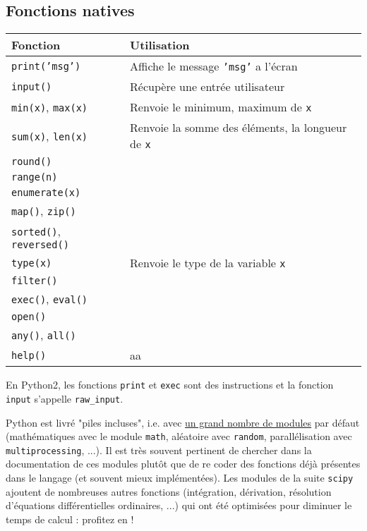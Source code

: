 \documentclass{article}
\begin{document}
\subsection*{Fonctions natives}

\begin{tabular}{|l|l|}
    \hline
    Fonction                                    & Utilisation\\
    \hline
    \texttt{print('msg')}                       & Affiche le message \texttt{'msg'} a l'écran\\
    \texttt{input()}                            & Récupère une entrée utilisateur\\
    \texttt{min(x)}, \texttt{max(x)}            & Renvoie le minimum, maximum de \texttt{x}\\
    \texttt{sum(x)}, \texttt{len(x)}            & Renvoie la somme des éléments, la longueur de \texttt{x}\\
    \texttt{round()}                            & \\
    \texttt{range(n)}                           &\\
    \texttt{enumerate(x)}                       &\\
    \texttt{map()}, \texttt{zip()}              & \\
    \texttt{sorted()}, \texttt{reversed()}      & \\
    \texttt{type(x)}                            & Renvoie le type de la variable \texttt{x}\\
    \texttt{filter()}                           &\\
    \texttt{exec()}, \texttt{eval()}            &\\
    \texttt{open()}                             &\\
    \texttt{any()}, \texttt{all()}              &\\
    \texttt{help()}                             & aa\\
    \hline
\end{tabular}

En Python2, les fonctions \texttt{print} et \texttt{exec} sont des instructions et la fonction \texttt{input} s'appelle \texttt{raw\_input}.

Python est livré "piles incluses", i.e. avec \href{https://docs.python.org/3/py-modindex.html}{un grand nombre de modules} par défaut (mathématiques avec le module \texttt{math}, aléatoire avec \texttt{random}, parallélisation avec \texttt{multiprocessing}, ...). Il est très souvent pertinent de chercher dans la documentation de ces modules plutôt que de re coder des fonctions déjà présentes dans le langage (et souvent mieux implémentées). Les modules de la suite \texttt{scipy} ajoutent de nombreuses autres fonctions (intégration, dérivation, résolution d'équations différentielles ordinaires, ...) qui ont été optimisées pour diminuer le temps de calcul : profitez en !
\end{document}
